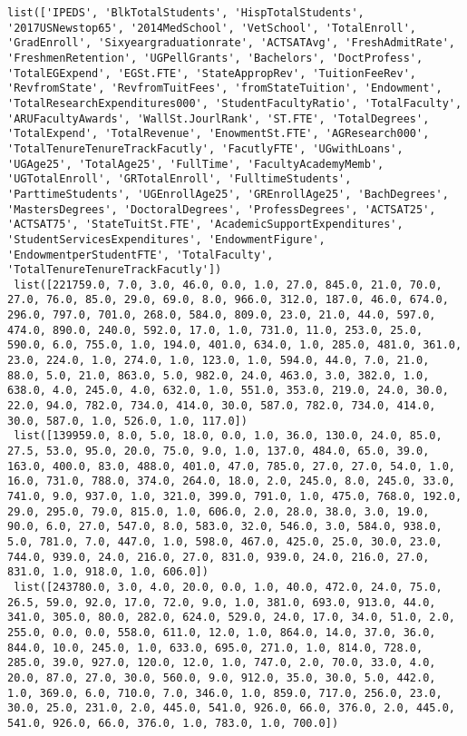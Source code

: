 \documentclass[11pt]{article}
\begin{document}
\begin{Verbatim}[commandchars=\\\{\}]
 list(['IPEDS', 'BlkTotalStudents', 'HispTotalStudents', '2017USNewstop65', '2014MedSchool', 'VetSchool', 'TotalEnroll', 'GradEnroll', 'Sixyeargraduationrate', 'ACTSATAvg', 'FreshAdmitRate', 'FreshmenRetention', 'UGPellGrants', 'Bachelors', 'DoctProfess', 'TotalEGExpend', 'EGSt.FTE', 'StateAppropRev', 'TuitionFeeRev', 'RevfromState', 'RevfromTuitFees', 'fromStateTuition', 'Endowment', 'TotalResearchExpenditures000', 'StudentFacultyRatio', 'TotalFaculty', 'ARUFacultyAwards', 'WallSt.JourlRank', 'ST.FTE', 'TotalDegrees', 'TotalExpend', 'TotalRevenue', 'EnowmentSt.FTE', 'AGResearch000', 'TotalTenureTenureTrackFacutly', 'FacutlyFTE', 'UGwithLoans', 'UGAge25', 'TotalAge25', 'FullTime', 'FacultyAcademyMemb', 'UGTotalEnroll', 'GRTotalEnroll', 'FulltimeStudents', 'ParttimeStudents', 'UGEnrollAge25', 'GREnrollAge25', 'BachDegrees', 'MastersDegrees', 'DoctoralDegrees', 'ProfessDegrees', 'ACTSAT25', 'ACTSAT75', 'StateTuitSt.FTE', 'AcademicSupportExpenditures', 'StudentServicesExpenditures', 'EndowmentFigure', 'EndowmentperStudentFTE', 'TotalFaculty', 'TotalTenureTenureTrackFacutly'])
 list([221759.0, 7.0, 3.0, 46.0, 0.0, 1.0, 27.0, 845.0, 21.0, 70.0, 27.0, 76.0, 85.0, 29.0, 69.0, 8.0, 966.0, 312.0, 187.0, 46.0, 674.0, 296.0, 797.0, 701.0, 268.0, 584.0, 809.0, 23.0, 21.0, 44.0, 597.0, 474.0, 890.0, 240.0, 592.0, 17.0, 1.0, 731.0, 11.0, 253.0, 25.0, 590.0, 6.0, 755.0, 1.0, 194.0, 401.0, 634.0, 1.0, 285.0, 481.0, 361.0, 23.0, 224.0, 1.0, 274.0, 1.0, 123.0, 1.0, 594.0, 44.0, 7.0, 21.0, 88.0, 5.0, 21.0, 863.0, 5.0, 982.0, 24.0, 463.0, 3.0, 382.0, 1.0, 638.0, 4.0, 245.0, 4.0, 632.0, 1.0, 551.0, 353.0, 219.0, 24.0, 30.0, 22.0, 94.0, 782.0, 734.0, 414.0, 30.0, 587.0, 782.0, 734.0, 414.0, 30.0, 587.0, 1.0, 526.0, 1.0, 117.0])
 list([139959.0, 8.0, 5.0, 18.0, 0.0, 1.0, 36.0, 130.0, 24.0, 85.0, 27.5, 53.0, 95.0, 20.0, 75.0, 9.0, 1.0, 137.0, 484.0, 65.0, 39.0, 163.0, 400.0, 83.0, 488.0, 401.0, 47.0, 785.0, 27.0, 27.0, 54.0, 1.0, 16.0, 731.0, 788.0, 374.0, 264.0, 18.0, 2.0, 245.0, 8.0, 245.0, 33.0, 741.0, 9.0, 937.0, 1.0, 321.0, 399.0, 791.0, 1.0, 475.0, 768.0, 192.0, 29.0, 295.0, 79.0, 815.0, 1.0, 606.0, 2.0, 28.0, 38.0, 3.0, 19.0, 90.0, 6.0, 27.0, 547.0, 8.0, 583.0, 32.0, 546.0, 3.0, 584.0, 938.0, 5.0, 781.0, 7.0, 447.0, 1.0, 598.0, 467.0, 425.0, 25.0, 30.0, 23.0, 744.0, 939.0, 24.0, 216.0, 27.0, 831.0, 939.0, 24.0, 216.0, 27.0, 831.0, 1.0, 918.0, 1.0, 606.0])
 list([243780.0, 3.0, 4.0, 20.0, 0.0, 1.0, 40.0, 472.0, 24.0, 75.0, 26.5, 59.0, 92.0, 17.0, 72.0, 9.0, 1.0, 381.0, 693.0, 913.0, 44.0, 341.0, 305.0, 80.0, 282.0, 624.0, 529.0, 24.0, 17.0, 34.0, 51.0, 2.0, 255.0, 0.0, 0.0, 558.0, 611.0, 12.0, 1.0, 864.0, 14.0, 37.0, 36.0, 844.0, 10.0, 245.0, 1.0, 633.0, 695.0, 271.0, 1.0, 814.0, 728.0, 285.0, 39.0, 927.0, 120.0, 12.0, 1.0, 747.0, 2.0, 70.0, 33.0, 4.0, 20.0, 87.0, 27.0, 30.0, 560.0, 9.0, 912.0, 35.0, 30.0, 5.0, 442.0, 1.0, 369.0, 6.0, 710.0, 7.0, 346.0, 1.0, 859.0, 717.0, 256.0, 23.0, 30.0, 25.0, 231.0, 2.0, 445.0, 541.0, 926.0, 66.0, 376.0, 2.0, 445.0, 541.0, 926.0, 66.0, 376.0, 1.0, 783.0, 1.0, 700.0])

\end{Verbatim}
\end{document}
